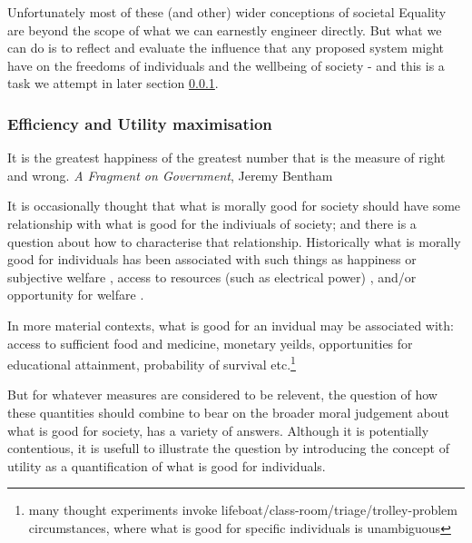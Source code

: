 Unfortunately most of these (and other) wider conceptions of societal Equality are beyond the scope of what we can earnestly engineer directly. But what we can do is to reflect and evaluate the influence that any proposed system might have on the freedoms of individuals and the wellbeing of society - and this is a task we attempt in later section \ref{}.

\subsubsection{Efficiency and Utility maximisation}


\begin{displayquote}It is the greatest happiness of the greatest number that is the measure of right and wrong. \textit{A Fragment on Government}, Jeremy Bentham\cite{bentham2001fragment}
\end{displayquote} 

It is occasionally thought that what is morally good for society should have some relationship with what is good for the indiviuals of society; and there is a question about how to characterise that relationship.
Historically what is morally good for individuals has been associated with such things as happiness \cite{burns2005happiness} or subjective welfare \cite{10.2307/2264894}, access to resources (such as electrical power) \cite{10.2307/2265047}, and/or opportunity for welfare \cite{10.2307/4320203}.%

In more material contexts, what is good for an invidual may be associated with: access to sufficient food and medicine, monetary yeilds, opportunities for educational attainment, probability of survival etc.\footnote{many thought experiments invoke lifeboat/class-room/triage/trolley-problem circumstances, where what is good for specific individuals is unambiguous}

But for whatever measures are considered to be relevent, the question of how these quantities should combine to bear on the broader moral judgement about what is good for society, has a variety of answers.
Although it is potentially contentious, it is usefull to illustrate the question by introducing the concept of utility as a quantification of what is good for individuals.

